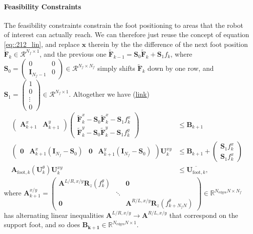 \paragraph{Feasibility Constraints}
The feasibility constraints constrain the foot positioning to areas that the robot of interest can actually reach. We can therefore just reuse the concept of equation \ref{eq::212_lin}, and replace $\bm{x}$ therein by the the difference of the next foot position $\tilde{\bm{F}}_{k}\in\mathcal{R}^{N_f\times1}$, and the previous one $\tilde{\bm{F}}_{k-1} = \bm{S}_0\tilde{\bm{F}}_{k} + \bm{S}_1f_k$, where $\bm{S}_0 = \begin{pmatrix}0 & 0 \\ \textbf{I}_{N_f-1} & 0
\end{pmatrix}\in\mathcal{R}^{N_f\times N_f}$ simply shifts $\tilde{\bm{F}}_{k}$ down by one row, and $\bm{S}_1 = \begin{pmatrix}
1 \\ 0 \\ \vdots \\ 0
\end{pmatrix}\in\mathcal{R}^{N_f\times1}$. Altogether we have (\href{https://github.com/mhubii/nmpc_pattern_generator/blob/dc1f5a9366cbbbf76f1b02cada642f6ac9a04c89/libs/pattern_generator/src/base_generator.cpp#L1061}{\underline{link}})
\begin{align}
\begin{pmatrix}
\bm{A}_{k+1}^{x}&\bm{A}_{k+1}^{y}\end{pmatrix} 
\begin{pmatrix}
\tilde{\bm{F}}^x_{k} - \bm{S}_0\tilde{\bm{F}}^x_{k} - \bm{S}_1f^x_k\\
\tilde{\bm{F}}^y_{k} - \bm{S}_0\tilde{\bm{F}}^y_{k} - \bm{S}_1f^y_k
\end{pmatrix} &\leq \bm{B}_{k+1} \\
\begin{pmatrix}
\bm{0} & \bm{A}_{k+1}^{x}(\textbf{I}_{N_f}-\bm{S}_0) & \bm{0} & \bm{A}_{k+1}^{y}(\textbf{I}_{N_f}-\bm{S}_0)
\end{pmatrix}\bm{U}_k^{xy} &\leq \bm{B}_{k+1}+\begin{pmatrix}
\bm{S}_1f_k^x \\ \bm{S}_1f_k^x 
\end{pmatrix}\\
\bm{A}_{\text{foot},k}(\bm{U}_k^\theta)\bm{U}_k^{xy} &\leq \overline{\bm{U}_{\text{foot},k}},
\label{eq::212_ineq_foot}
\end{align}
where $\bm{A}_{k+1}^{x/y}=\begin{pmatrix}
	\bm{A}^{L/R,x/y}\bm{R}_z(f_{k}^\theta)& & \bm{0} \\
	&\ddots &\\
	\bm{0} &           &\bm{A}^{R/L,x/y}\bm{R}_z(f_{k+N_fN}^\theta)
\end{pmatrix}\in\mathbb{R}^{N_\text{edges}N\times N_f}$ has alternating linear inequalities $\bm{A}^{L/R,x/y}\rightarrow\bm{A}^{R/L,x/y}$ that correspond on the support foot, and so does $\bm{B_{k+1}}\in\mathbb{R}^{N_\text{edges}N\times1}$. 
